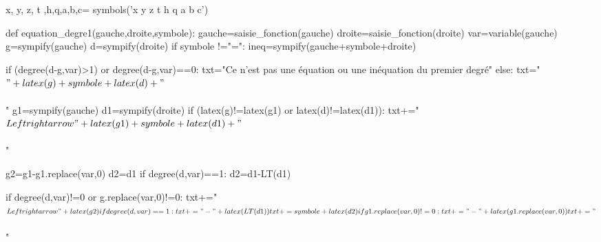 \begin{pycode}
x, y, z, t ,h,q,a,b,c= symbols('x y z t h q a b c')


def equation_degre1(gauche,droite,symbole):
    gauche=saisie_fonction(gauche)
    droite=saisie_fonction(droite)
    var=variable(gauche)
    g=sympify(gauche)
    d=sympify(droite)
    if symbole !="=":
        ineq=sympify(gauche+symbole+droite)

    if (degree(d-g,var)>1) or degree(d-g,var)==0:
        txt="Ce n'est pas une équation ou une inéquation du premier degré"
    else:
        txt="$"+latex(g)+symbole+latex(d)+"$\\\\"
        g1=sympify(gauche)
        d1=sympify(droite)
        if (latex(g)!=latex(g1) or latex(d)!=latex(d1)):
            txt+="$ \\Leftrightarrow "+latex(g1)+symbole+latex(d1)+"$\\\\"

        g2=g1-g1.replace(var,0)
        d2=d1
        if degree(d,var)==1:
            d2=d1-LT(d1)

        if degree(d,var)!=0 or g.replace(var,0)!=0:
            txt+="$ \\Leftrightarrow "+latex(g2)
            if degree(d,var)==1:
                txt+="-"+latex(LT(d1))
            txt+=symbole+latex(d2)
            if g1.replace(var,0)!=0:
                txt+="-"+latex(g1.replace(var,0))
            txt+="$\\\\"


\end{pycode}
